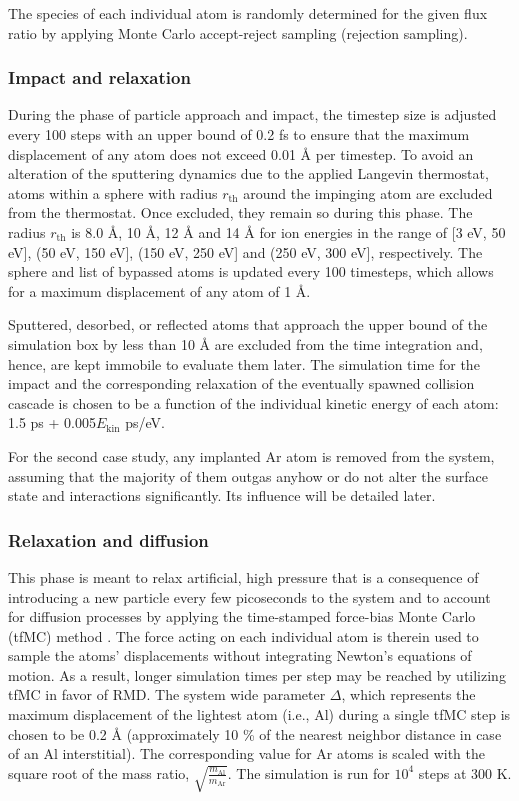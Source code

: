 \documentclass[12pt,a4paper,preprint,superscriptaddress]{revtex4-1}
\begin{document}
The species of each individual atom is randomly determined for the given flux ratio by applying Monte Carlo accept-reject sampling (rejection sampling).

\subsubsection{Impact and relaxation}
\label{sssec:impact_and_relaxation}

During the phase of particle approach and impact, the timestep size is adjusted every 100 steps with an upper bound of 0.2 fs to ensure that the maximum displacement of any atom does not exceed 0.01 \r A per timestep. To avoid an alteration of the sputtering dynamics due to the applied Langevin thermostat, atoms within a sphere with radius $r_\mathrm{th}$ around the impinging atom are excluded from the thermostat. Once excluded, they remain so during this phase. The radius $r_\mathrm{th}$ is 8.0 \r A, 10 \r A, 12 \r A and 14 \r A for ion energies in the range of [3 eV, 50 eV], (50 eV, 150 eV], (150 eV, 250 eV] and (250 eV, 300 eV], respectively. The sphere and list of bypassed atoms is updated every 100 timesteps, which allows for a maximum displacement of any atom of 1 \r A. 

Sputtered, desorbed, or reflected atoms that approach the upper bound of the simulation box by less than 10 \r A are excluded from the time integration and, hence, are kept immobile to evaluate them later. The simulation time for the impact and the corresponding relaxation of the eventually spawned collision cascade is chosen to be a function of the individual kinetic energy of each atom: 1.5 ps + 0.005$E_\mathrm{kin}$ ps/eV.

For the second case study, any implanted Ar atom is removed from the system, assuming that the majority of them outgas anyhow or do not alter the surface state and interactions significantly. Its influence will be detailed later.

\subsubsection{Relaxation and diffusion}
\label{sssec:relaxation_and_diffusion}

This phase is meant to relax artificial, high pressure that is a consequence of introducing a new particle every few picoseconds to the system and to account for diffusion processes by applying the time-stamped force-bias Monte Carlo (tfMC) method \citep{neyts2014combining,bal2014time,mees2012uniform}. The force acting on each individual atom is therein used to sample the atoms' displacements without integrating Newton's equations of motion. As a result, longer simulation times per step may be reached by utilizing tfMC in favor of RMD. The system wide parameter $\Delta$, which represents the maximum displacement of the lightest atom (i.e., Al) during a single tfMC step is chosen to be 0.2 \r A (approximately 10 \% of the nearest neighbor distance in case of an Al interstitial). The corresponding value for Ar atoms is scaled with the square root of the mass ratio, $\sqrt{\frac{m_\mathrm{Al}}{m_\mathrm{Ar}}}$. The simulation is run for $10^4$ steps at 300 K.
\end{document}
